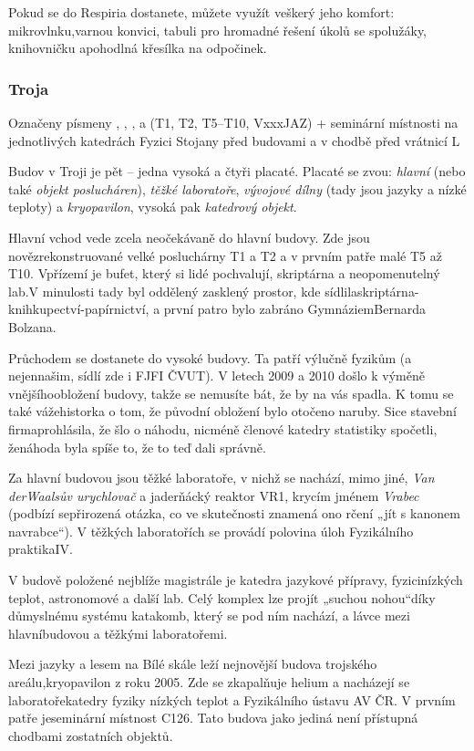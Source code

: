 Pokud se do Respiria dostanete, můžete využít veškerý jeho komfort:
mikrovlnku,varnou konvici, tabuli pro hromadné řešení úkolů se spolužáky,
knihovničku apohodlná křesílka na odpočinek.


\subsubsection{Troja}

{Označeny písmeny , , ,  a  (T1, T2, T5--T10,
VxxxJAZ) + seminární místnosti na
jednotlivých katedrách}
{Fyzici}
{Stojany před budovami a v chodbě před vrátnicí L}

\noindent Budov v Troji je pět – jedna vysoká a čtyři placaté. Placaté se zvou:
\textit{hlavní}
(nebo také \textit{objekt poslucháren}), \textit{těžké laboratoře},
\textit{vývojové dílny} (tady jsou
jazyky a nízké teploty) a \textit{kryopavilon}, vysoká pak \textit{katedrový
objekt}.

Hlavní vchod vede zcela neočekávaně do hlavní budovy. Zde jsou
novězrekonstruované velké posluchárny T1 a T2 a v prvním patře malé T5 až T10.
Vpřízemí je bufet, který si lidé pochvalují, skriptárna a neopomenutelný lab.V
minulosti tady byl oddělený zasklený prostor, kde
sídlilaskriptárna-knihkupectví-papírnictví, a první patro bylo zabráno
GymnáziemBernarda Bolzana.

Průchodem se dostanete do vysoké budovy. Ta patří výlučně fyzikům (a nejennašim,
sídlí zde i FJFI ČVUT). V letech 2009 a 2010 došlo k výměně vnějšíhoobložení
budovy, takže se nemusíte bát, že by na vás spadla. K tomu se také vážehistorka
o tom, že původní obložení bylo otočeno naruby. Sice stavební firmaprohlásila,
že šlo o náhodu, nicméně členové katedry statistiky spočetli, ženáhoda byla
spíše to, že to teď dali správně.

Za hlavní budovou jsou těžké laboratoře, v nichž se nachází, mimo jiné,
\textit{Van derWaalsův urychlovač} a jaderňácký reaktor VR1, krycím jménem
\textit{Vrabec} (podbízí sepřirozená otázka, co ve skutečnosti znamená ono rčení
„jít s kanonem navrabce“). V těžkých laboratořích se provádí polovina úloh
Fyzikálního praktikaIV.

V budově položené nejblíže magistrále je katedra jazykové přípravy,
fyzicinízkých teplot, astronomové a další lab. Celý komplex lze projít „suchou
nohou“díky důmyslnému systému katakomb, který se pod ním nachází, a lávce mezi
hlavníbudovou a těžkými laboratořemi.

Mezi jazyky a lesem na Bílé skále leží nejnovější budova trojského
areálu,kryopavilon z roku 2005. Zde se zkapalňuje helium a nacházejí se
laboratořekatedry fyziky nízkých teplot a Fyzikálního ústavu AV ČR. V prvním
patře jeseminární místnost C126. Tato budova jako jediná není přístupná chodbami
zostatních objektů.